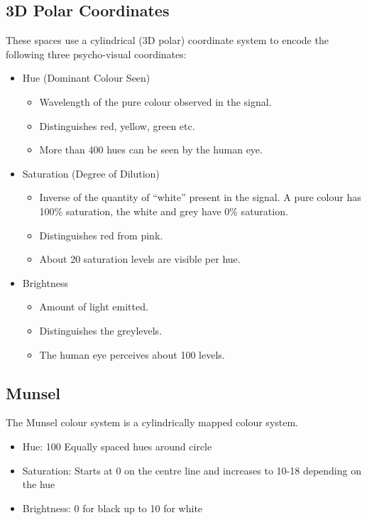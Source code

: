 \documentclass{article}
\begin{document}
\subsection{3D Polar Coordinates}
These spaces use a cylindrical (3D polar) coordinate system to encode the following three psycho-visual coordinates:
\begin{itemize}
	\item Hue (Dominant Colour Seen)
		\begin{itemize}
			\item Wavelength of the pure colour observed in the signal.
			\item Distinguishes red, yellow, green etc.
			\item More than 400 hues can be seen by the human eye.
		\end{itemize}
	\item Saturation (Degree of Dilution)
		\begin{itemize}
			\item Inverse of the quantity of ``white'' present in the signal.
			A pure colour has 100\% saturation, the white and grey have 0\% saturation.
			\item Distinguishes red from pink.
			\item About 20 saturation levels are visible per hue.
		\end{itemize}
	\item Brightness
		\begin{itemize}
			\item Amount of light emitted.
			\item Distinguishes the greylevels.
			\item The human eye perceives about 100 levels.
		\end{itemize}
\end{itemize}

\subsection{Munsel}
The Munsel colour system is a cylindrically mapped colour system.
\begin{itemize}
	\item Hue: 100 Equally spaced hues around circle
	\item Saturation: Starts at 0 on the centre line and increases to 10-18 depending on the hue
	\item Brightness: 0 for black up to 10 for white
\end{itemize}
\end{document}
